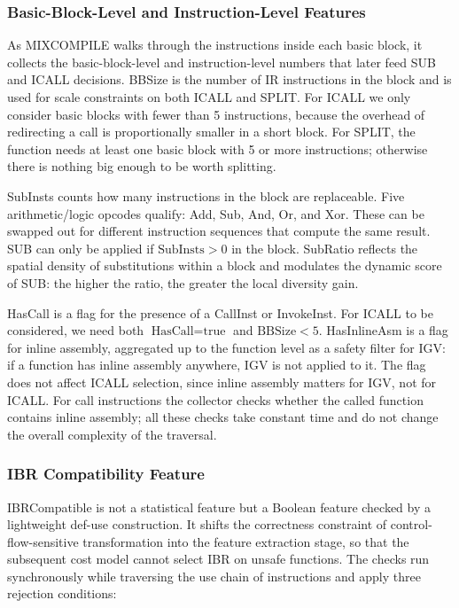 \documentclass[pdflatex,sn-mathphys-num]{sn-jnl}
\theoremstyle{thmstyleone}%
\theoremstyle{thmstyletwo}%
\theoremstyle{thmstylethree}%
\begin{document}
\subsubsection{Basic-Block-Level and Instruction-Level Features}

As MIXCOMPILE walks through the instructions inside each basic block, it collects
the basic-block-level and instruction-level numbers that later feed SUB and ICALL
decisions. BBSize is the number of IR instructions in the block and is used for
scale constraints on both ICALL and SPLIT. For ICALL we only consider basic
blocks with fewer than 5 instructions, because the overhead of redirecting a call
is proportionally smaller in a short block. For SPLIT, the function needs at
least one basic block with 5 or more instructions; otherwise there is nothing
big enough to be worth splitting.

SubInsts counts how many instructions in the block are replaceable. Five
arithmetic/logic opcodes qualify: Add, Sub, And, Or, and Xor. These can be swapped out
for different instruction sequences that compute the same result. SUB can only be
applied if $\text{SubInsts} > 0$ in the block. SubRatio reflects the spatial density of
substitutions within a block and modulates the dynamic score of SUB: the higher the
ratio, the greater the local diversity gain.

HasCall is a flag for the presence of a CallInst or InvokeInst. For ICALL to be
considered, we need both $\text{HasCall} = \text{true}$ and $\text{BBSize} < 5$.
HasInlineAsm is a flag for inline assembly, aggregated up to the function level as a
safety filter for IGV: if a function has inline assembly anywhere, IGV is not applied
to it. The flag does not affect ICALL selection, since inline assembly matters for
IGV, not for ICALL. For call instructions the collector checks whether the called
function contains inline assembly; all these checks take constant time and do not
change the overall complexity of the traversal.

\subsubsection{IBR Compatibility Feature}

IBRCompatible is not a statistical feature but a Boolean feature checked by a
lightweight def-use construction. It shifts the correctness constraint of
control-flow-sensitive transformation into the feature extraction stage, so that the
subsequent cost model cannot select IBR on unsafe functions. The checks run
synchronously while traversing the use chain of instructions and apply three rejection
conditions:
\end{document}
